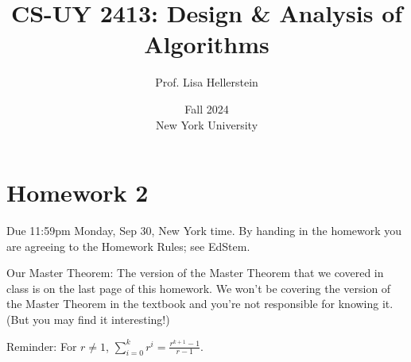 \documentclass{article}
\begin{document}
\title{CS-UY 2413: Design \& Analysis of Algorithms}
\author{Prof. Lisa Hellerstein}
\date{Fall 2024 \\ New York University}

\maketitle

\section*{Homework 2}
Due 11:59pm Monday, Sep 30, New York time. By handing in the homework you are agreeing to the Homework Rules; see EdStem.

Our Master Theorem: The version of the Master Theorem that we covered in class is on the last page of this homework. We won’t be covering the version of the Master Theorem in the textbook and you’re not responsible for knowing it. (But you may find it interesting!)

Reminder: For $r \neq 1$, $\sum_{i=0}^{k} r^i = \frac{r^{k+1}-1}{r-1}$.
\end{document}
